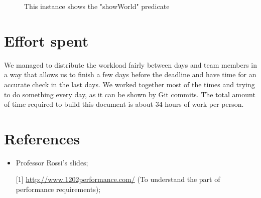 \documentclass[12pt,titlepage]{article}
\begin{document}
\begin{landscape}
\newpage
\begin{figure}[h]
\caption{This instance shows the "showWorld" predicate}
\end{figure}
\clearpage
\end{landscape}

\pagebreak
\pagebreak
\pagebreak
\section{Effort spent}\label{sec:crit}
We managed to distribute the workload fairly between days and team members in a way that allows us to finish a few days before the deadline and have time for an accurate check in the last days.
We worked together most of the times and trying to do something every day, as it can be shown by Git commits.
The total amount of time required to build this document is about 34 hours of work per person.
\pagebreak

\section{References}\label{sec:crit}
\begin{itemize}
\item Professor Rossi's slides;
\item [{[1]}] \url{http://www.1202performance.com/} (To understand the part of performance requirements);
\end{itemize}
\end{document}
